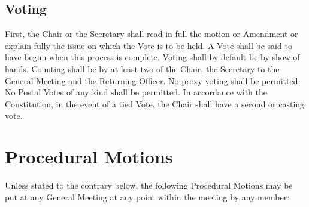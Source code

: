 \subsection{Voting}
\npara First, the Chair or the Secretary shall read in full the motion or Amendment or explain fully the issue on which the Vote is to be held. A Vote shall be said to have begun when this process is complete.
\npara Voting shall by default be by show of hands.
\npara Counting shall be by at least two of the Chair, the Secretary to the General Meeting and the Returning Officer.
\npara No proxy voting shall be permitted.
\npara No Postal Votes of any kind shall be permitted.
\npara In accordance with the Constitution, in the event of a tied Vote, the Chair shall have a second or casting vote.
\section{Procedural Motions}
\npara Unless stated to the contrary below, the following Procedural Motions may be put at any General Meeting at any point within the meeting by any member:
